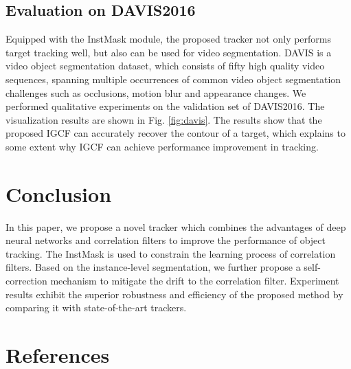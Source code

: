 \documentclass[review]{elsarticle}
\begin{document}
\begin{CJK*}{UTF8}{gbsn}
\subsection{Evaluation on DAVIS2016}
Equipped with the InstMask module, the proposed tracker not only performs target tracking well, but also can be used for video segmentation. DAVIS \cite{Perazzi2016} is a video object segmentation dataset, which consists of fifty high quality video sequences, spanning multiple occurrences of common video object segmentation challenges such as occlusions, motion blur and appearance changes. We performed qualitative experiments on the validation set of DAVIS2016. The visualization results are shown in Fig. \ref{fig:davis}. The results show that the proposed IGCF can accurately recover the contour of a target, which explains to some extent why IGCF can achieve performance improvement in tracking.

\section{Conclusion}
In this paper, we propose a novel tracker which combines the advantages of deep neural networks and correlation filters to improve the performance of object tracking.
The InstMask is used to constrain the learning process of correlation filters. Based on the instance-level segmentation, we further propose a self-correction mechanism to mitigate the drift to the correlation filter.
Experiment results exhibit the superior robustness and efficiency of the proposed method by comparing it with state-of-the-art trackers.

\end{CJK*}

\section*{References}


\end{document}
